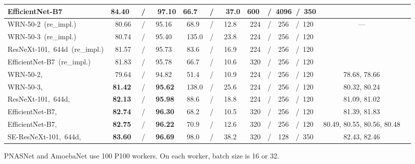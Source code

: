 \documentclass[lettersize,journal]{IEEEtran}
\begin{document}
\begin{table*}[htbp]
{\begin{threeparttable}
\begin{tabular}{lccccc}
				EfficientNet-B7~\cite{2019_EfficientNet}
				& \textbf{84.40}~~~/~~~\textbf{97.10}
				& 66.7~~~/~~~37.0
				& 600~~/~4096~/~350 \\			
				
				\midrule		
				
				WRN-50-2~(re\_impl.)
				& 80.66~~~/~~~95.16
				& 68.9~~~/~~~12.8
				& 224~~/~~256~~/~120 
				& \multirow{4}{*}{---}\\
				
				WRN-50-3~(re\_impl.)
				& 80.74~~~/~~~95.40
				& 135.0~~/~~~23.8			
				& 224~~/~~256~~/~120  \\
				
				ResNeXt-101,~644d~(re\_impl.)
				& 81.57~~~/~~~95.73
				& 83.6~~~/~~~16.9				
				& 224~~/~~256~~/~120 \\
				
				EfficientNet-B7~(re\_impl.)
				& 81.83~~~/~~~95.78
				& 66.7~~~/~~~10.6				
				& 320~~/~~256~~/~120 
				\\			
				\midrule	
				
				WRN-50-2,~
				& 79.64~~~/~~~94.82
				& 51.4~~~/~~~10.9	
				& 224~~/~~256~~/~120 
				& 78.68, 78.66\\
				
				WRN-50-3,~
				& \textbf{81.42}~~~/~~~\textbf{95.62}
				& 138.0~~/~~~25.6				
				& 224~~/~~256~~/~120 
				& 80.32, 80.24 \\
				
				ResNeXt-101,~644d,~
				& \textbf{82.13}~~~/~~~\textbf{95.98}
				& 88.6~~~/~~~18.8				
				& 224~~/~~256~~/~120 
				& 81.09, 81.02 \\
				
				EfficientNet-B7,~& \textbf{82.74}~~~/~~~\textbf{96.30}
				& 68.2~~~/~~~10.5	
				& 320~~/~~256~~/~120 
				& 81.39, 81.83 \\

				EfficientNet-B7,~& \textbf{82.75}~~~/~~~\textbf{96.22}
				& 70.9~~~/~~~12.6	
				& 320~~/~~256~~/~120 
				& 80.49, 80.55, 80.56, 80.48 \\



				SE-ResNeXt-101,~644d,~& \textbf{83.60}~~~/~~~\textbf{96.69}
				& 98.0~~~/~~~38.2				
				& 320~~/~~128~~/~350
				& 82.43, 82.46 \\

				\bottomrule	
			\end{tabular} 
			\begin{tablenotes}
				{\footnotesize 
					\item[] PNASNet and AmoebaNet use 100 P100 workers. On each worker, batch size is 16 or 32.
}
			\end{tablenotes}
		\end{threeparttable}
	}
\end{table*}
 
\end{document}

